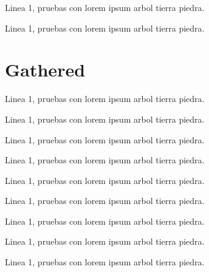 \insertgathercaptioned[\label{gathe3}]{arg2}{}

Linea 1, pruebas con lorem ipsum arbol tierra piedra.


Linea 1, pruebas con lorem ipsum arbol tierra piedra.

\newpage
\section{Gathered}

Linea 1, pruebas con lorem ipsum arbol tierra piedra.


Linea 1, pruebas con lorem ipsum arbol tierra piedra.


Linea 1, pruebas con lorem ipsum arbol tierra piedra.

\insertgathered[\label{gather1}]{arg2}

Linea 1, pruebas con lorem ipsum arbol tierra piedra.


Linea 1, pruebas con lorem ipsum arbol tierra piedra.


Linea 1, pruebas con lorem ipsum arbol tierra piedra.


Linea 1, pruebas con lorem ipsum arbol tierra piedra.

\insertgatheredcaptioned[\label{gathe3}]{arg2}{}

Linea 1, pruebas con lorem ipsum arbol tierra piedra.


Linea 1, pruebas con lorem ipsum arbol tierra piedra.


\newpage
